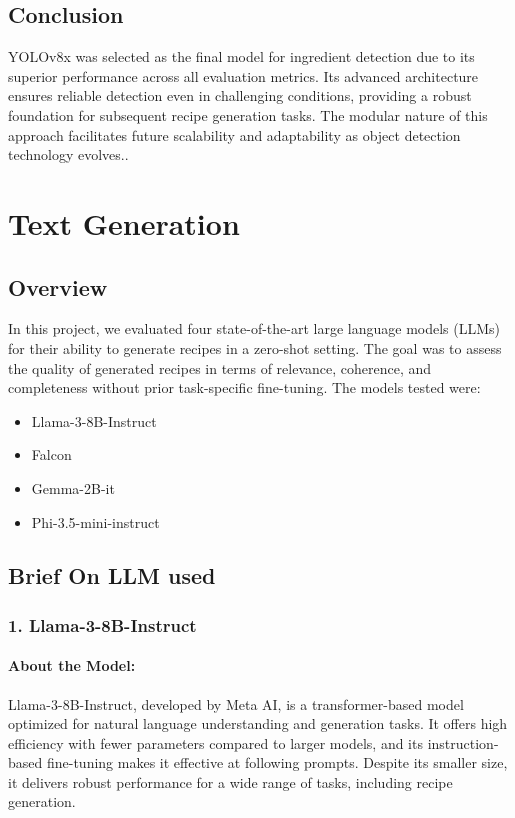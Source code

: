 \documentclass[letterpaper,11pt]{report}
\begin{document}
\subsection{Conclusion}
YOLOv8x was selected as the final model for ingredient detection due to its superior performance across all evaluation metrics. Its advanced architecture ensures reliable detection even in challenging conditions, providing a robust foundation for subsequent recipe generation tasks. The modular nature of this approach facilitates future scalability and adaptability as object detection technology evolves..
\clearpage
\section{Text Generation}

\subsection{Overview}
In this project, we evaluated four state-of-the-art large language models (LLMs) for their ability to generate recipes in a zero-shot setting. The goal was to assess the quality of generated recipes in terms of relevance, coherence, and completeness without prior task-specific fine-tuning. The models tested were:
\begin{itemize}
    \item Llama-3-8B-Instruct
    \item Falcon
    \item Gemma-2B-it
    \item Phi-3.5-mini-instruct
\end{itemize}

\subsection{Brief On LLM used}

\subsubsection{1. Llama-3-8B-Instruct}

\paragraph{About the Model:}  
Llama-3-8B-Instruct, developed by Meta AI, is a transformer-based model optimized for natural language understanding and generation tasks. It offers high efficiency with fewer parameters compared to larger models, and its instruction-based fine-tuning makes it effective at following prompts. Despite its smaller size, it delivers robust performance for a wide range of tasks, including recipe generation.
\end{document}
